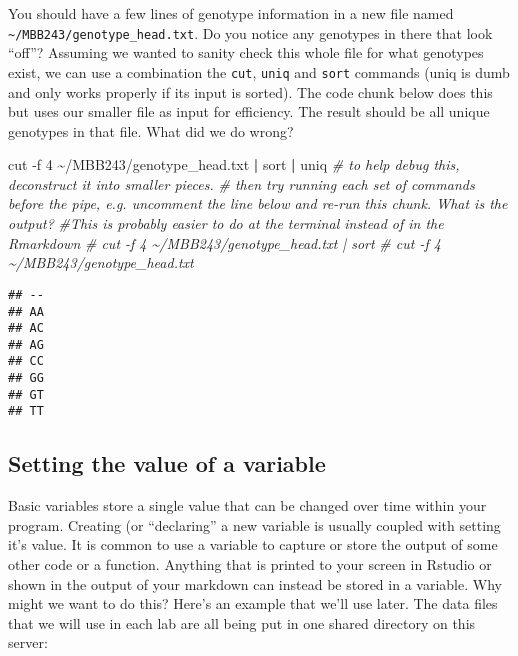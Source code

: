\documentclass[
]{article}
\newenvironment{Shaded}{\begin{snugshade}}{\end{snugshade}}
\newcommand{\AttributeTok}[1]{\textcolor[rgb]{0.77,0.63,0.00}{#1}}
\newcommand{\CommentTok}[1]{\textcolor[rgb]{0.56,0.35,0.01}{\textit{#1}}}
\newcommand{\FunctionTok}[1]{\textcolor[rgb]{0.00,0.00,0.00}{#1}}
\newcommand{\KeywordTok}[1]{\textcolor[rgb]{0.13,0.29,0.53}{\textbf{#1}}}
\newcommand{\NormalTok}[1]{#1}
\begin{document}
You should have a few lines of genotype information in a new file named
\texttt{\textasciitilde{}/MBB243/genotype\_head.txt}. Do you notice any
genotypes in there that look ``off''? Assuming we wanted to sanity check
this whole file for what genotypes exist, we can use a combination the
\texttt{cut}, \texttt{uniq} and \texttt{sort} commands (uniq is dumb and
only works properly if its input is sorted). The code chunk below does
this but uses our smaller file as input for efficiency. The result
should be all unique genotypes in that file. What did we do wrong?

\begin{Shaded}
\begin{Highlighting}[]
\FunctionTok{cut} \AttributeTok{{-}f}\NormalTok{ 4 \textasciitilde{}/MBB243/genotype\_head.txt }\KeywordTok{|} \FunctionTok{sort} \KeywordTok{|} \FunctionTok{uniq}
\CommentTok{\# to help debug this, deconstruct it into smaller pieces.}
\CommentTok{\# then try running each set of commands before the pipe, e.g. uncomment the line below and re{-}run this chunk. What is the output?  }
\CommentTok{\#This is probably easier to do at the terminal instead of in the Rmarkdown}
\CommentTok{\# cut {-}f 4 \textasciitilde{}/MBB243/genotype\_head.txt | sort }
\CommentTok{\# cut {-}f 4 \textasciitilde{}/MBB243/genotype\_head.txt }
\end{Highlighting}
\end{Shaded}

\begin{verbatim}
## --
## AA
## AC
## AG
## CC
## GG
## GT
## TT
\end{verbatim}

\hypertarget{setting-the-value-of-a-variable}{%
\subsection{Setting the value of a
variable}\label{setting-the-value-of-a-variable}}

Basic variables store a single value that can be changed over time
within your program. Creating (or ``declaring'' a new variable is
usually coupled with setting it's value. It is common to use a variable
to capture or store the output of some other code or a function.
Anything that is printed to your screen in Rstudio or shown in the
output of your markdown can instead be stored in a variable. Why might
we want to do this? Here's an example that we'll use later. The data
files that we will use in each lab are all being put in one shared
directory on this server:
\end{document}
